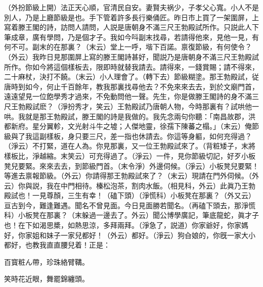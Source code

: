 \begin{myquote}
{\marktext\small（外扮節級上開）}法正天心順，官清民自安。妻賢夫祸少，子孝父心寬。小人不是別人，乃是上廳節級是也。手下管着許多長行樂俑匠。昨日市上買了一架圍屏，上寫着滕王閣的詩，訪問人請問，人説是唐朝身不滿三尺王勃殿試所作。只説此人下筆成章，廣有學問，乃是個才子。我如今呌副末找尋，若請得他來，見他一見，有何不可。副末的在那裏？{\marktext\small（末云）}堂上一呼，堦下百諾。禀復節級，有何使令？{\marktext\small（外云）}我昨日見那圍屏上寫的滕王閣詩甚好，聞説乃是唐朝身不滿三尺王勃殿試所作。你如今將這個樣板去，限即時就替我請去。請得來，一錢賞賜；請不得來，二十麻杖，決打不饒。{\marktext\small（末云）}小人理會了。{\marktext\small（轉下去）}節級糊塗。那王勃殿試，従唐時到如今，何止千百餘年，教我那裏找尋他去？不免來來去去，到於文廟門首，遠遠望見一位飽學秀才過來，不免動問他一聲。先生，你是做滕王閣詩的身不滿三尺王勃殿試麽？{\marktext\small（淨扮秀才，笑云）}王勃殿試乃唐朝人物，今時那裏有？試哄他一哄。我就是那王勃殿試，滕王閣的詩是我做的。我先念兩句你聽：「南昌故郡，洪都新府。星分翼軫，文光射斗牛之墟；人傑地靈，徐孺下陳蕃之榻。」{\marktext\small（末云）}俺節級與了我這副樣板，身只要三尺，差一指也休請去。你這等身軀，如何充得過？{\marktext\small（淨云）}不打緊，道在人為。你見那裏，又一位王勃殿試來了。{\marktext\small（背粧矮子，末將樣板比，淨越縮。末笑云）}可充得過了。{\marktext\small（淨云）}一件，見你節級切記，好歹小板凳兒要緊。來來去去，到節級門首。{\marktext\small（末令淨）}外邊伺候。{\marktext\small（淨云）}小板凳兒要緊！等進去禀報節級。{\marktext\small（外云）}你請得那王勃殿試來了？{\marktext\small（末云）}現請在門外伺候。{\marktext\small（外云）}你與説，我在中門相待。榛松泡茶，割肉水飯。{\marktext\small（相見科，外云）}此眞乃王勃殿試也！一見尊顏，三生有幸！{\marktext\small（磕下頭）（淨慌科）}小板凳在那裏？{\marktext\small（外又云）}亘古到今，難逢難遇。聞名不曾見面。今日見面勝若聞名。{\marktext\small（再磕下頭去，那淨慌科）}小板凳在那裏？{\marktext\small（末躲過一邊去了。外云）}聞公博學廣記，筆底龍蛇，眞才子也！在下如渴思槳，如熱思涼，多拜兩拜。{\marktext\small（淨急了，説道）}你家爺好，你家媽好，你家姐和妹子一家兒都好！{\marktext\small（外云）}都好。{\marktext\small（淨云）}狗㒲娘的，你旣一家大小都好，也教我直直腰兒着！正是：

百寳粧ん帶，珍珠絡臂鞲。

笑時花近眼，舞罷錦纏頭。
\end{myquote}


